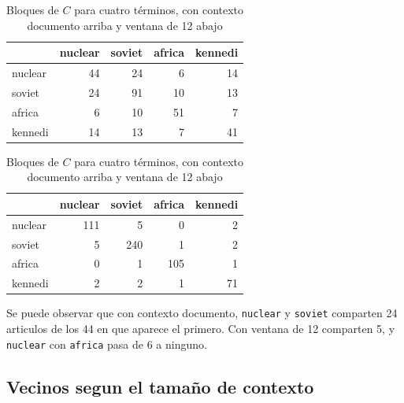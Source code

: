 \documentclass[11pt,letterpaper]{article}
\begin{document}
\begin{table}[H]
  \centering
  \begin{tabular}{lrrrr}
    \toprule
    & \textbf{nuclear} & \textbf{soviet} & \textbf{africa}
      & \textbf{kennedi} \\
    \midrule
    nuclear &  44 & 24 &  6 & 14 \\
    soviet  &  24 & 91 & 10 & 13 \\
    africa  &   6 & 10 & 51 &  7 \\
    kennedi &  14 & 13 &  7 & 41 \\
    \bottomrule
  \end{tabular}
  \quad
  \begin{tabular}{lrrrr}
    \toprule
    & \textbf{nuclear} & \textbf{soviet} & \textbf{africa}
      & \textbf{kennedi} \\
    \midrule
    nuclear & 111 &   5 &   0 &  2 \\
    soviet  &   5 & 240 &   1 &  2 \\
    africa  &   0 &   1 & 105 &  1 \\
    kennedi &   2 &   2 &   1 & 71 \\
    \bottomrule
  \end{tabular}
  \caption{Bloques de $C$ para cuatro términos, con contexto
    documento arriba y ventana de 12 abajo}
  \label{tab:bloques}
\end{table}

Se puede observar que con contexto documento,
\texttt{nuclear} y \texttt{soviet} comparten 24 articulos de los 44 en
que aparece el primero. Con ventana de 12 comparten 5, y
\texttt{nuclear} con \texttt{africa} pasa de 6 a ninguno.

\subsection*{Vecinos segun el tamaño de contexto}
\end{document}
